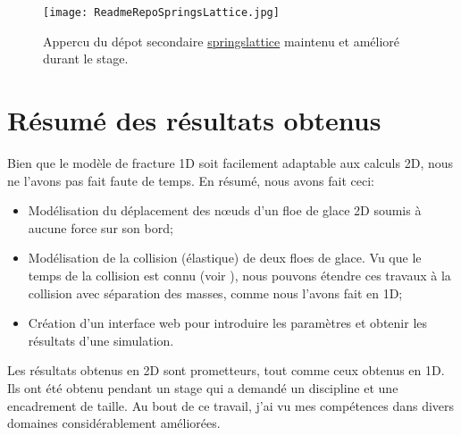 \begin{figure}[!h]
    \centering
    \texttt{[image: ReadmeRepoSpringsLattice.jpg]}
    \caption{Appercu du dépot secondaire \href{https://framagit.org/RaK/SimuRessorts/-/tree/master}{springslattice} maintenu et amélioré durant le stage.}
    \label{fig:readme2d}
\end{figure}



\section{Résumé des résultats obtenus}

Bien que le modèle de fracture 1D soit facilement adaptable aux calculs 2D, nous ne l'avons pas fait faute de temps. En résumé, nous avons fait ceci:
\begin{itemize}
    \item Modélisation du déplacement des n\oe{}uds d'un floe de glace 2D soumis à aucune force sur son bord;
    \item Modélisation de la collision (élastique) de deux floes de glace. Vu que le temps de la collision est connu (voir \parencite{rabatel2015thesis}), nous pouvons étendre ces travaux à la collision avec séparation des masses, comme nous l'avons fait en 1D;
    \item Création d'un interface web pour introduire les paramètres et obtenir les résultats d'une simulation. 
\end{itemize}

Les résultats obtenus en 2D sont prometteurs, tout comme ceux obtenus en 1D. Ils ont été obtenu pendant un stage qui a demandé un discipline et une encadrement de taille. Au bout de ce travail, j'ai vu mes compétences dans divers domaines considérablement améliorées.
